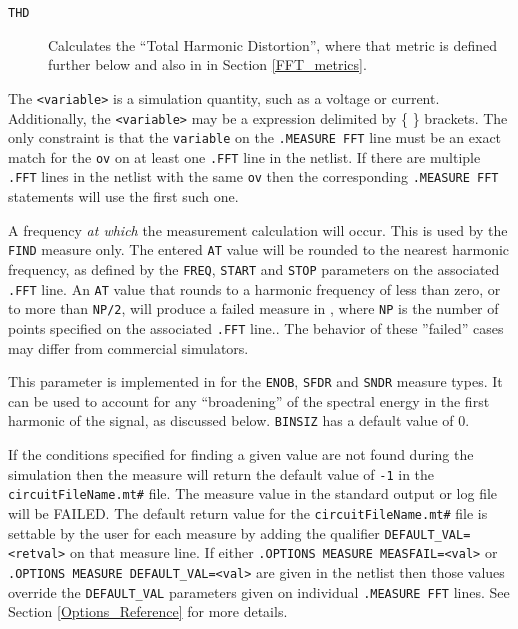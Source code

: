 \begin{Command}
\begin{Arguments}
\begin{description}
  \item[\tt THD] Calculates the ``Total Harmonic Distortion'', where that metric
    is defined further below and also in in Section \ref{FFT_metrics}.
\end{description}


The \texttt{<variable>} is a simulation quantity, such as a
voltage or current.  Additionally, the \texttt{<variable>} may be
a \Xyce{} expression delimited by \{ \} brackets.  The only constraint
is that the \texttt{variable} on the \texttt{.MEASURE FFT} line must
be an exact match for the \texttt{ov} on at least one \texttt{.FFT} line
in the netlist.  If there are multiple \texttt{.FFT} lines in the netlist
with the same \texttt{ov} then the corresponding \texttt{.MEASURE FFT}
statements will use the first such one.

A frequency {\em at which} the measurement calculation will occur.  This is
used by the {\tt FIND} measure only.  The entered {\tt AT} value will be
rounded to the nearest harmonic frequency, as defined by the {\tt FREQ},
{\tt START} and {\tt STOP} parameters on the associated {\tt .FFT} line.
An {\tt AT} value that rounds to a harmonic frequency of less than zero,
or to more than {\tt NP/2}, will produce a failed measure in \Xyce{}, where
{\tt NP} is the number of points specified on the associated {\tt .FFT} line..
The behavior of these ''failed'' cases may differ from commercial simulators.

This parameter is implemented in \Xyce{} for the \texttt{ENOB}, \texttt{SFDR}
and \texttt{SNDR} measure types. It can be used to account for any ``broadening''
of the spectral energy in the first harmonic of the signal, as discussed below.
\texttt{BINSIZ} has a default value of 0.


If the conditions specified for finding a given value are not found
during the simulation then the measure will return the default value
of {\tt -1} in the \texttt{circuitFileName.mt\#} file.
The measure value in the standard output or log file will be
FAILED.  The default return value for the \texttt{circuitFileName.mt\#}
file is settable by the user for each measure by adding the qualifier
{\tt DEFAULT\_VAL=<retval>} on that measure line.  If either
\texttt{.OPTIONS MEASURE MEASFAIL=<val>} or
\texttt{.OPTIONS MEASURE DEFAULT\_VAL=<val>} are given in the
netlist then those values override the \texttt{DEFAULT\_VAL}
parameters given on individual \texttt{.MEASURE FFT} lines.
See Section \ref{Options_Reference} for more details.


\end{Arguments}
\end{Command}
